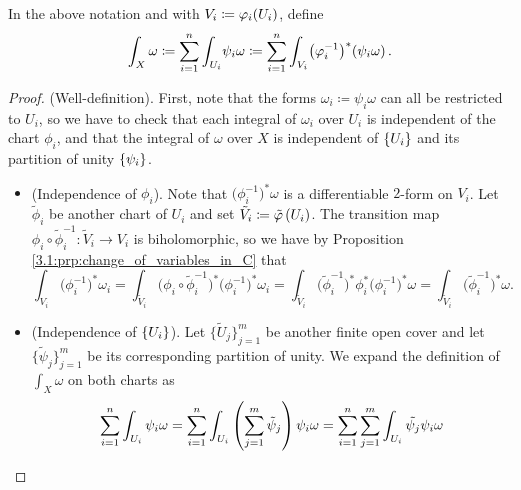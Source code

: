 \documentclass[../Moduli_Spaces_of_Riemann_Surfaces.tex]{subfiles}
\begin{document}
    \begin{defprop}
        In the above notation and with $V_i\coloneqq\varphi_i\!\left(U_i\right)$, define
        \begin{equation*}
            \int_X\omega\coloneqq\sum_{i=1}^{n}\int_{U_i}\!\psi_i\omega\coloneqq\sum_{i=1}^{n}\int_{V_i}\!\big(\varphi_i^{-1}\big)^\ast\!\left(\psi_i\omega\right).
        \end{equation*}
    \end{defprop}
    \begin{proof}
        (Well-definition). First, note that the forms $\omega_i\coloneqq\psi_i\omega$ can all be restricted to $U_i$, so we have to check that each integral of $\omega_i$ over $U_i$ is independent of the chart $\phi_i$, and that the integral of $\omega$ over $X$ is independent of $\left\{U_i\right\}$ and its partition of unity $\left\{\psi_i\right\}$.
        \begin{itemize}
            \item (Independence of $\phi_i$). Note that $\big(\phi_i^{-1}\big)^\ast\omega$ is a differentiable $2$-form on $V_i$. Let $\tilde{\phi}_i$ be another chart of $U_i$ and set $\tilde{V}_i\coloneqq\tilde{\varphi}\left(U_i\right)$. The transition map $\phi_i\circ\tilde{\phi}_i^{-1}:\tilde{V}_i\to V_i$ is biholomorphic, so we have by Proposition \ref{3.1:prp:change_of_variables_in_C} that
                \begin{equation*}
                    \int_{V_i}\!\big(\phi_i^{-1}\big)^\ast\omega_i=\int_{\tilde{V}_i}\!\big(\phi_i\circ\tilde{\phi}_i^{-1}\big)^\ast\big(\phi_i^{-1}\big)^\ast\omega_i=\int_{\tilde{V}_i}\!\big(\tilde{\phi}_i^{-1}\big)^\ast\phi_i^\ast\big(\phi_i^{-1}\big)^\ast\omega=\int_{\tilde{V}_i}\!\big(\tilde{\phi}_i^{-1}\big)^\ast\omega.
                \end{equation*}
            \item (Independence of $\left\{U_i\right\}$). Let $\big\{\tilde{U}_j\big\}_{j=1}^m$ be another finite open cover and let $\big\{\tilde{\psi}_j\big\}_{j=1}^m$ be its corresponding partition of unity. We expand the definition of $\int_X\omega$ on both charts as
                \begin{equation*}
                    \begin{gathered}
                        \sum_{i=1}^{n}\int_{U_i}\psi_i\omega=\sum_{i=1}^{n}\int_{U_i}\l(\sum_{j=1}^{m}\tilde{\psi}_j\r)\psi_i\omega=\sum_{i=1}^{n}\sum_{j=1}^{m}\int_{U_i}\tilde{\psi_j}\psi_i\omega \\

\end{gathered}
\end{equation*}
\end{itemize}
\end{proof}
\end{document}
